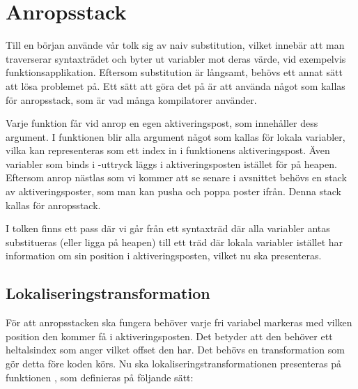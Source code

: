 \documentclass[../Core]{subfiles}
\begin{document}
\section{Anropsstack}
\label{sec:CallStack}

Till en början använde vår tolk sig av naiv substitution, vilket innebär att man
traverserar syntaxträdet och byter ut variabler mot deras värde, vid exempelvis
funktionsapplikation.
Eftersom substitution är långsamt, behövs ett annat sätt att lösa problemet
på. Ett sätt att göra det på är att använda något som kallas för anropsstack, som
är vad många kompilatorer använder. %

Varje funktion får vid anrop en egen aktiveringspost, som innehåller dess argument.
I funktionen blir alla argument något som kallas för lokala variabler, vilka kan representeras
som ett index in i funktionens aktiveringspost. Även variabler som binds i
-uttryck läggs i aktiveringsposten istället för på heapen. 
Eftersom anrop nästlas som vi kommer att se senare i avsnittet
behövs en stack av aktiveringsposter, som man kan pusha och poppa poster ifrån.
Denna stack kallas för anropsstack.

I tolken finns ett pass där vi går från ett syntaxträd där alla variabler
antas substitueras (eller ligga på heapen) till ett träd där lokala variabler
istället har information om sin position i aktiveringsposten, vilket nu ska presenteras.




\subsection{Lokaliseringstransformation}

För att anropsstacken ska fungera behöver varje fri variabel 
markeras med vilken position den kommer få
i aktiveringsposten. Det betyder att den behöver ett heltalsindex som anger
vilket offset den har. Det behövs en transformation som gör detta före koden 
körs. Nu ska lokaliseringstransformationen presenteras på funktionen , som
definieras på följande sätt:
\end{document}
